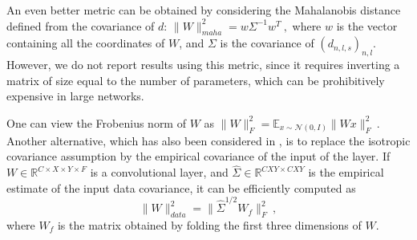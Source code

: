 An even better metric can be obtained by considering the Mahalanobis distance defined from the covariance of 
$d$: $\| W \|_{maha}^2 = w \Sigma^{-1} w^T~,$
where $w$ is the vector containing all the coordinates of $W$, and $\Sigma$ is the covariance of $(d_{n,l,s})_{n,l}$. 
However, we do not report results using this metric, since it requires inverting a matrix of size equal to the number 
of parameters, which can be prohibitively expensive in large networks.

One can view the Frobenius norm of $W$ as
$\| W \|_F^2 = \mathbb{E}_{x \sim \mathcal{N}(0,I)} \| W x \|_F^2 ~.$
Another alternative, which has also been considered in \cite{zisserman14}, is to replace the isotropic covariance
assumption by the empirical covariance of the input of the layer. If $W \in \mathbb{R}^{C \times X \times Y \times F}$ 
is a convolutional layer, and $\widehat{\Sigma} \in \mathbb{R}^{CXY \times CXY}$ is the empirical estimate of the input data covariance, 
it can be efficiently computed as 
\begin{equation}
\| W \|_{data}^2 = \| \widehat{\Sigma}^{1/2} W_f \|_F^2~, 
\end{equation}
where $W_f$ is the matrix obtained by folding the first three dimensions of $W$.

